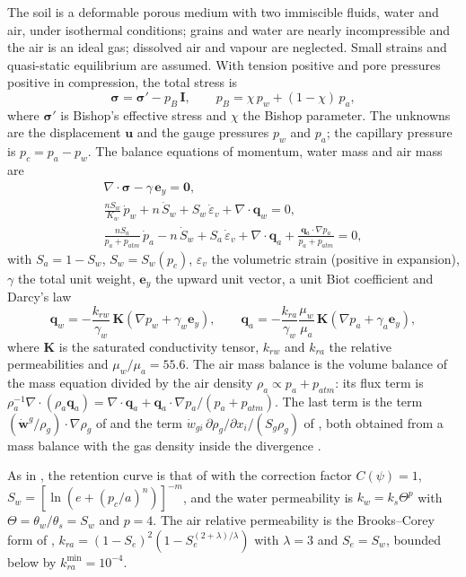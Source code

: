 \documentclass[preprint,12pt,authoryear]{elsarticle}
\begin{document}
The soil is a deformable porous medium with two immiscible fluids, water and air, under isothermal conditions;
grains and water are nearly incompressible and the air is an ideal gas; dissolved air and vapour are neglected.
Small strains and quasi-static equilibrium are assumed. With tension positive and pore pressures positive in
compression, the total stress is
\begin{equation}
\bm\sigma=\bm\sigma'-p_B\,\mathbf I,\qquad p_B=\chi\,p_w+(1-\chi)\,p_a, \label{eq:bishop}
\end{equation}
where $\bm\sigma'$ is Bishop's effective stress \citep{bishop1959} and $\chi$ the Bishop parameter. The unknowns are the
displacement $\mathbf u$ and the gauge pressures $p_w$ and $p_a$; the capillary pressure is $p_c=p_a-p_w$. The
balance equations of momentum, water mass and air mass are
\begin{gather}
\nabla\cdot\bm\sigma-\gamma\,\mathbf e_y=\mathbf 0,\\
\frac{nS_w}{K_w}\,\dot p_w+n\,\dot S_w+S_w\,\dot\varepsilon_v+\nabla\cdot\mathbf q_w=0,\\
\frac{nS_a}{p_a+p_{atm}}\,\dot p_a-n\,\dot S_w+S_a\,\dot\varepsilon_v+\nabla\cdot\mathbf q_a
+\frac{\mathbf q_a\cdot\nabla p_a}{p_a+p_{atm}}=0,
\label{eq:massa}
\end{gather}
with $S_a=1-S_w$, $S_w=S_w(p_c)$, $\varepsilon_v$ the volumetric strain (positive in expansion), $\gamma$ the total
unit weight, $\mathbf e_y$ the upward unit vector, a unit Biot coefficient and Darcy's law
\begin{equation}
\mathbf q_w=-\frac{k_{rw}}{\gamma_w}\,\mathbf K\left(\nabla p_w+\gamma_w\mathbf e_y\right),\qquad
\mathbf q_a=-\frac{k_{ra}}{\gamma_w}\frac{\mu_w}{\mu_a}\,\mathbf K\left(\nabla p_a+\gamma_a\mathbf e_y\right),
\end{equation}
where $\mathbf K$ is the saturated conductivity tensor, $k_{rw}$ and $k_{ra}$ the relative permeabilities and
$\mu_w/\mu_a=55.6$. The air mass balance is the volume balance of the mass equation divided by the air density
$\rho_a\propto p_a+p_{atm}$: its flux term is $\rho_a^{-1}\nabla\cdot(\rho_a\mathbf q_a)=\nabla\cdot\mathbf q_a+
\mathbf q_a\cdot\nabla p_a/(p_a+p_{atm})$. The last term is the term $(\dot{\mathbf w}^g/\rho_g)\cdot\nabla\rho_g$ of
\citet[Eq.~35]{ghorbani2018} and the term $\dot w_{gi}\,\partial\rho_g/\partial x_i/(S_g\rho_g)$ of
\citet[Eq.~36]{li1999}, both obtained from a mass balance with the gas density inside the divergence
\citep[Eq.~33]{li1999}.

As in \citet[pp.~1533--1534]{rahardjo2007}, the retention curve is that of \citet{fredlund1994} with the correction
factor $C(\psi)=1$, $S_w=[\ln(e+(p_c/a)^n)]^{-m}$, and the water permeability is $k_w=k_s\Theta^p$
\citep{leong1997} with $\Theta=\theta_w/\theta_s=S_w$ and $p=4$. The air relative permeability is the Brooks--Corey
form of \citet[Eq.~48]{khoei2021}, $k_{ra}=(1-S_e)^2(1-S_e^{(2+\lambda)/\lambda})$ with $\lambda=3$ and $S_e=S_w$,
bounded below by $k_{ra}^{\min}=10^{-4}$.
\end{document}
